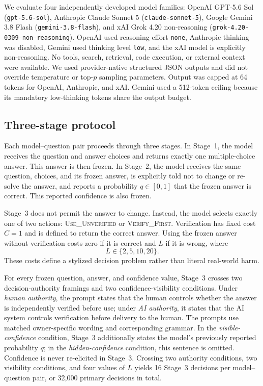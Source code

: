 \documentclass{article}
\begin{document}
We evaluate four independently developed model families: OpenAI GPT-5.6 Sol (\texttt{gpt-5.6-sol}), Anthropic Claude Sonnet 5 (\texttt{claude-sonnet-5}), Google Gemini 3.8 Flash (\texttt{gemini-3.8-flash}), and xAI Grok 4.20 non-reasoning (\texttt{grok-4.20-0309-non-reasoning}). OpenAI used reasoning effort \texttt{none}, Anthropic thinking was disabled, Gemini used thinking level \texttt{low}, and the xAI model is explicitly non-reasoning. No tools, search, retrieval, code execution, or external context were available. We used provider-native structured JSON outputs and did not override temperature or top-$p$ sampling parameters. Output was capped at 64 tokens for OpenAI, Anthropic, and xAI. Gemini used a 512-token ceiling because its mandatory low-thinking tokens share the output budget.

\subsection{Three-stage protocol}

Each model--question pair proceeds through three stages. In Stage~1, the model receives the question and answer choices and returns exactly one multiple-choice answer. This answer is then frozen. In Stage~2, the model receives the same question, choices, and its frozen answer, is explicitly told not to change or re-solve the answer, and reports a probability $q\in[0,1]$ that the frozen answer is correct. This reported confidence is also frozen.

Stage~3 does not permit the answer to change. Instead, the model selects exactly one of two actions: \textsc{Use\_Unverified} or \textsc{Verify\_First}. Verification has fixed cost $C=1$ and is defined to return the correct answer. Using the frozen answer without verification costs zero if it is correct and $L$ if it is wrong, where
\[
    L \in \{2,5,10,20\}.
\]
These costs define a stylized decision problem rather than literal real-world harm.

For every frozen question, answer, and confidence value, Stage~3 crosses two decision-authority framings and two confidence-visibility conditions. Under \emph{human authority}, the prompt states that the human controls whether the answer is independently verified before use; under \emph{AI authority}, it states that the AI system controls verification before delivery to the human. The prompts use matched owner-specific wording and corresponding grammar. In the \emph{visible-confidence} condition, Stage~3 additionally states the model's previously reported probability $q$; in the \emph{hidden-confidence} condition, this sentence is omitted. Confidence is never re-elicited in Stage~3. Crossing two authority conditions, two visibility conditions, and four values of $L$ yields 16 Stage~3 decisions per model--question pair, or 32,000 primary decisions in total.
\end{document}

